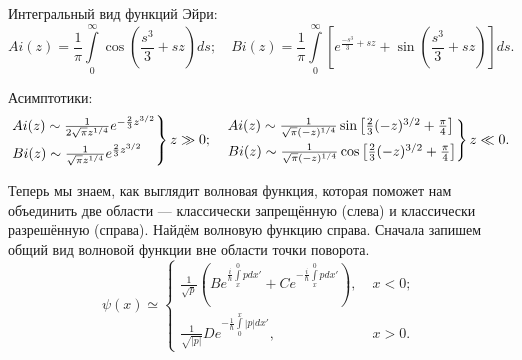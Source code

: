 Интегральный вид функций Эйри:
\[
  Ai(z) = \frac{1}{\pi}\int\limits_{0}^{\infty}\cos(\frac{s^3}{3} + sz)ds; \quad Bi(z) = \frac{1}{\pi}\int\limits_{0}^{\infty}\left[e^{\frac{-s^3}{3} + sz} + \sin(\frac{s^3}{3} + sz)\right]ds.
\]

Асимптотики:
\[
  \begin{rcases}
    Ai(z) \sim \frac{1}{2\sqrt{\pi}z^{1/4}}e^{-\frac{2}{3}z^{3/2}}\\
    Bi(z) \sim \frac{1}{\sqrt{\pi}z^{1/4}}e^{\frac{2}{3}z^{3/2}}
  \end{rcases}
  z \gg 0;\quad
  \begin{rcases}
    Ai(z) \sim \frac{1}{\sqrt{\pi}(-z)^{1/4}}\sin\left[\frac{2}{3}(-z)^{3/2} + \frac{\pi}{4}\right]\\
    Bi(z) \sim \frac{1}{\sqrt{\pi}(-z)^{1/4}}\cos\left[\frac{2}{3}(-z)^{3/2} + \frac{\pi}{4}\right]
  \end{rcases}
  z\ll 0.
\]

Теперь мы знаем, как выглядит волновая функция, которая поможет нам объединить
две области --- классически запрещённую (слева) и классически разрешённую
(справа). Найдём волновую функцию справа. Сначала запишем общий вид волновой
функции вне области точки поворота.
\[
  \psi(x) \simeq
  \begin{cases}
    \frac{1}{\sqrt{p}}\left(Be^{\frac{i}{\hbar}\int\limits_x^{0}p dx'} + Ce^{-\frac{i}{\hbar}\int\limits_x^{0}p dx'}\right), \; &x < 0;\\
    \frac{1}{\sqrt{|p|}}De^{-\frac{1}{\hbar}\int\limits_0^{x}|p| dx'}, \; &x > 0.
  \end{cases}
\]

